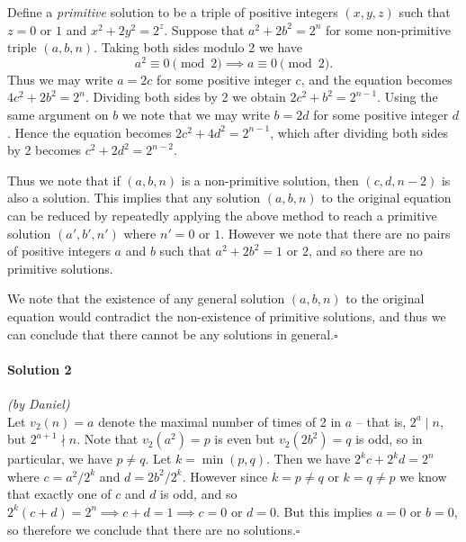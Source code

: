 \documentclass[10pt]{article}
\begin{document}
	\noindent Define a \emph{primitive} solution to be a triple of positive integers \((x, y, z)\) such that \(z = 0\) or \(1\) and \(x^2 + 2y^2 = 2^z\). Suppose that \(a^2 + 2b^2 = 2^n\) for some non-primitive triple \((a, b, n)\). Taking both sides modulo 2 we have \[a^2 \equiv 0 \pmod 2 \implies a \equiv 0 \pmod 2.\] Thus we may write \(a = 2c\) for some positive integer \(c\), and the equation becomes \(4c^2 + 2b^2 = 2^n\). Dividing both sides by 2 we obtain \(2c^2 + b^2 = 2^{n-1}\). Using the same argument on \(b\) we note that we may write \(b = 2d\) for some positive integer \(d\). Hence the equation becomes \(2c^2 + 4d^2 = 2^{n-1}\), which after dividing both sides by 2 becomes \(c^2 + 2d^2 = 2^{n-2}\).
	
	Thus we note that if \((a, b, n)\) is a non-primitive solution, then \((c, d, n-2)\) is also a solution. This implies that any solution \((a, b, n)\) to the original equation can be reduced by repeatedly applying the above method to reach a primitive solution \((a', b', n')\) where \(n' = 0\) or \(1\). However we note that there are no pairs of positive integers \(a\) and \(b\) such that \(a^2 + 2b^2 = 1\) or \(2\), and so there are no primitive solutions.
	
	We note that the existence of any general solution \((a, b, n)\) to the original equation would contradict the non-existence of primitive solutions, and thus we can conclude that there cannot be any solutions in general.\hfill\ensuremath{\square}\\
	
		\noindent \makebox[\linewidth]{\rule{\textwidth}{0.4pt}}
	
	\paragraph{Solution 2} \textit{(by Daniel)}\\
	
	\noindent Let \(v_2(n) = a\) denote the maximal number of times of 2 in \(a\) -- that is, \(2^a \mid n\), but \(2^{a+1} \nmid n\). Note that \(v_2(a^2) = p\) is even but \(v_2(2b^2) = q\) is odd, so in particular, we have \(p \neq q\). Let \(k = \min (p,q)\). Then we have \(2^k c + 2^k d = 2^n\) where \(c = a^2/2^k\) and \(d = 2b^2/2^k\). However since \(k = p \neq q\) or \(k = q \neq p\) we know that exactly one of \(c\) and \(d\) is odd, and so \(2^k (c+d) = 2^n \implies c+d = 1 \implies c = 0\) or \(d = 0\). But this implies \(a = 0\) or \(b = 0\), so therefore we conclude that there are no solutions.\hfill\ensuremath{\square}
	
\end{document}
